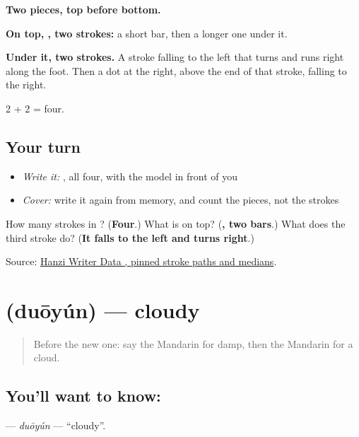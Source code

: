 \begin{quote}
\end{quote}

\textbf{Two pieces, top before bottom.}

\textbf{On top, , two strokes:} a short bar, then a longer one under it.

\textbf{Under it, two strokes.} A stroke falling to the left that turns and runs right along the foot. Then a dot at the right, above the end of that stroke, falling to the right.

2 + 2 = four.

\subsection*{Your turn}
\begin{itemize}
\raggedright
  \item \emph{Write it:} , all four, with the model in front of you
  \item \emph{Cover:} write it again from memory, and count the pieces, not the strokes
\end{itemize}

\begin{tcolorbox}[breakable,colback=teal!4,colframe=teal!35!black,title={Before you move on}]
How many strokes in ? (\textbf{Four}.) What is on top? (\textbf{, two bars}.) What does the third stroke do? (\textbf{It falls to the left and turns right}.)

Source: \href{https://raw.githubusercontent.com/chanind/hanzi-writer-data/68d10a4b21150cae5e1ebbd223eed289cf32d90c/data/\%E4\%BA\%91.json}{Hanzi Writer Data , pinned stroke paths and medians}.
\end{tcolorbox}
\section[\texorpdfstring{\zh{多云} (duōyún)}{多云 (duōyún)}]{ (duōyún) — cloudy}

\label{lesson:ZH-C219-duoyun}



\begin{quote}
Before the new one: say the Mandarin for damp, then the Mandarin for a cloud.
\end{quote}

\subsection*{You'll want to know: }
\textbf{} — \emph{duōyún} — \textquotedblleft{}cloudy\textquotedblright{}.


